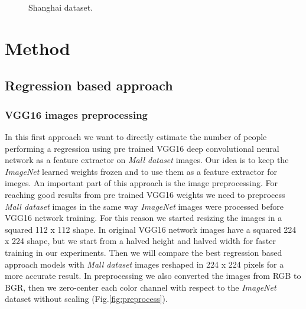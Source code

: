 \documentclass[10pt,twocolumn,letterpaper]{article}
\begin{document}
\begin{figure}[h!]%
	\centering
	\qquad
	\caption{Shanghai dataset.}
\end{figure}

\section{Method}
\subsection{Regression based approach}

\subsubsection{VGG16 images preprocessing}

In this first approach we want to directly estimate the number of people performing a regression using pre trained VGG16 deep convolutional neural network \cite{simonyan2014very} as a feature extractor on \textit{Mall dataset} images. Our idea is to keep the \textit{ImageNet} learned weights frozen and to use them as a feature extractor for imeges. An important part of this approach is the image preprocessing. For reaching good results from pre trained VGG16 weights we need to preprocess \textit{Mall dataset} images in the same way \textit{ImageNet} images were processed before VGG16 network training. For this reason we started resizing the images in a squared 112 x 112 shape. In original VGG16 network images have a squared 224 x 224 shape, but we start from a halved height and halved width for faster training in our experiments. Then we will compare the best regression based approach models with \textit{Mall dataset} images reshaped in 224 x 224 pixels for a more accurate result. In preprocessing we also converted the images from RGB to BGR, then we zero-center each color channel with respect to the \textit{ImageNet} dataset without scaling (Fig.\ref{fig:preprocess}).
\end{document}
